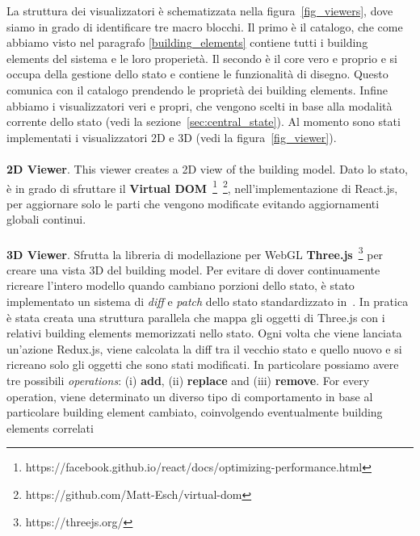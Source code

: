 La struttura dei visualizzatori \`e schematizzata nella figura~\ref{fig_viewers}, dove siamo in grado di identificare tre macro blocchi. Il primo \`e il catalogo, che come abbiamo visto nel paragrafo \ref{building_elements} contiene tutti i building elements del sistema e le loro properiet\`a. Il secondo \`e il core vero e proprio e si occupa della gestione dello stato e contiene le funzionalit\`a di disegno. Questo comunica con il catalogo prendendo le propriet\`a dei building elements. Infine abbiamo i visualizzatori veri e propri, che vengono scelti in base alla modalit\`a corrente dello stato (vedi la sezione~\ref{sec:central_state}). Al momento sono stati implementati i visualizzatori 2D e 3D (vedi la figura~\ref{fig_viewer}).\\\\
\textbf{2D Viewer}. This viewer creates a 2D view of the building model. Dato lo stato, \`e in grado di sfruttare il \textbf{Virtual DOM}~\footnote{https://facebook.github.io/react/docs/optimizing-performance.html}~\footnote{https://github.com/Matt-Esch/virtual-dom}, nell'implementazione di React.js, per aggiornare solo le parti che vengono modificate evitando aggiornamenti globali continui.\\\\
\textbf{3D Viewer}. Sfrutta la libreria di modellazione per WebGL \textbf{Three.js}~\footnote{https://threejs.org/} per creare una vista 3D del building model. Per evitare di dover continuamente ricreare l'intero modello quando cambiano porzioni dello stato, \`e stato implementato un sistema di \textit{diff} e \textit{patch} dello stato standardizzato in~\cite{rfc6902}. In pratica \`e stata creata una struttura parallela che mappa gli oggetti di Three.js con i relativi building elements memorizzati nello stato. Ogni volta che viene lanciata un'azione Redux.js, viene calcolata la diff tra il vecchio stato e quello nuovo e si ricreano solo gli oggetti che sono stati modificati. In particolare possiamo avere tre possibili \textit{operations}: (i) \textbf{add}, (ii) \textbf{replace} and (iii) \textbf{remove}. For every operation, viene determinato un diverso tipo di comportamento in base al particolare building element cambiato, coinvolgendo eventualmente building elements correlati



